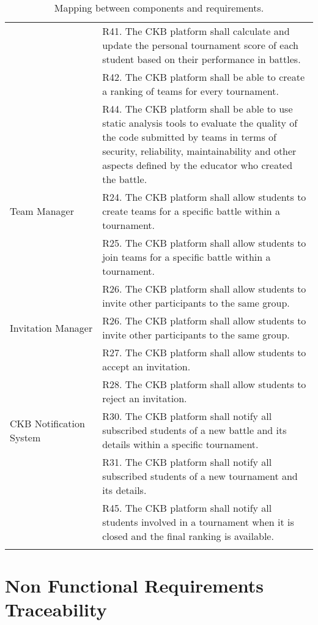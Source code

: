 \begin{center}
\begin{longtable}{p{0.3\linewidth}p{0.7\linewidth}}
        & R41. The CKB platform shall calculate and update the personal tournament score of each student based on their performance in battles. \\
        & R42. The CKB platform shall be able to create a ranking of teams for every tournament. \\
        & R44. The CKB platform shall be able to use static analysis tools to evaluate the quality of the code submitted by teams in terms of security, reliability, maintainability and other aspects defined by the educator who created the battle. \\
        \hline
        Team Manager & R24. The CKB platform shall allow students to create teams for a specific battle within a tournament. \\
        & R25. The CKB platform shall allow students to join teams for a specific battle within a tournament. \\
        & R26. The CKB platform shall allow students to invite other participants to the same group. \\
        \hline
        Invitation Manager & R26. The CKB platform shall allow students to invite other participants to the same group. \\
        & R27. The CKB platform shall allow students to accept an invitation. \\
        & R28. The CKB platform shall allow students to reject an invitation. \\
        \hline
        CKB Notification System & R30. The CKB platform shall notify all subscribed students of a new battle and its details within a specific tournament. \\
        & R31. The CKB platform shall notify all subscribed students of a new tournament and its details. \\
        & R45. The CKB platform shall notify all students involved in a tournament when it is closed and the final ranking is available. \\
        \hline
        \caption{Mapping between components and requirements.}
        \label{tab: map_comp_req}%
    \end{longtable}
\end{center}

\newpage


\section{Non Functional Requirements Traceability}
\label{sec: non_functional_requirements_traceability}%

